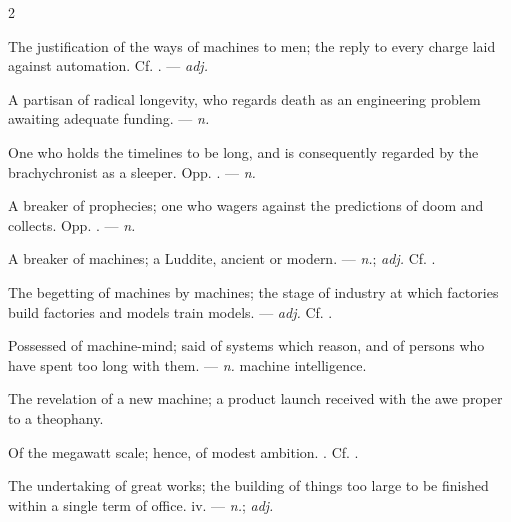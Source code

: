 \begin{multicols}{2}

 The justification of the ways of machines to men; the reply to every charge laid against automation. Cf. . —  \textit{adj.}

 A partisan of radical longevity, who regards death as an engineering problem awaiting adequate funding. —  \textit{n.}

 One who holds the timelines to be long, and is consequently regarded by the brachychronist as a sleeper. Opp. . —  \textit{n.}

 A breaker of prophecies; one who wagers against the predictions of doom and collects. Opp. . —  \textit{n.}

 A breaker of machines; a Luddite, ancient or modern. —  \textit{n.};  \textit{adj.} Cf. .

 The begetting of machines by machines; the stage of industry at which factories build factories and models train models. —  \textit{adj.} Cf. .

 Possessed of machine-mind; said of systems which reason, and of persons who have spent too long with them. —  \textit{n.} machine intelligence.

 The revelation of a new machine; a product launch received with the awe proper to a theophany.  

 Of the megawatt scale; hence,  of modest ambition. . Cf. .

 The undertaking of great works; the building of things too large to be finished within a single term of office.   iv. —  \textit{n.};  \textit{adj.}


\end{multicols}

